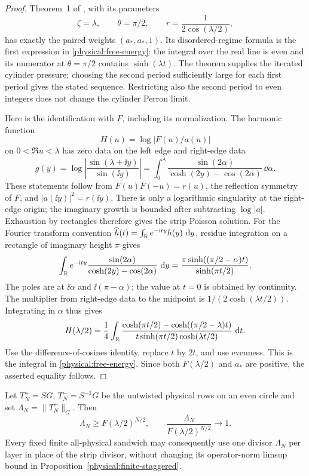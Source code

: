 \begin{proof}
Theorem~1 of \cite{SixVertex2022}, with its parameters
\[
 \zeta=\lambda,\qquad \theta=\pi/2,\qquad
 r=\frac1{2\cos(\lambda/2)},
\]
has exactly the paired weights \((a_*,a_*,1)\). Its disordered-regime
formula is the first expression in \eqref{physical:free-energy}:
the integral over the real line is even and its numerator at
\(\theta=\pi/2\) contains \(\sinh(\lambda t)\).
The theorem supplies the iterated cylinder pressure; choosing the
second period sufficiently large for each first period gives the
stated sequence. Restricting also the second period to even integers
does not change the cylinder Perron limit.

Here is the identification with \(F\), including its normalization.
The harmonic function
\[
 H(u)=\log|F(u)/a(u)|
\]
on \(0<\Re u<\lambda\) has zero data on the left edge and right-edge
data
\[
 g(y)=\log\left|\frac{\sin(\lambda+\ii y)}{\sin(\ii y)}\right|
 =\int_0^\lambda
 \frac{\sin(2\alpha)}{\cosh(2y)-\cos(2\alpha)}\,\dd\alpha.
\]
These statements follow from \(F(u)F(-u)=r(u)\), the reflection
symmetry of \(F\), and \(|a(\ii y)|^2=r(\ii y)\).
There is only a logarithmic singularity at the right-edge origin;
the imaginary growth is bounded after subtracting \(\log|a|\).
Exhaustion by rectangles therefore gives the strip Poisson solution.
For the Fourier transform convention
\(\widehat h(t)=\int_{\mathbb R}e^{-\mathrm i ty}h(y)\,\,\mathrm d y\), residue
integration on a rectangle of imaginary height \(\pi\) gives
\[
 \int_{\mathbb R}e^{-\mathrm i ty}
 \frac{\sin(2\alpha)}{\cosh(2y)-\cos(2\alpha)}\,\,\mathrm d y
 =\frac{\pi\sinh((\pi/2-\alpha)t)}{\sinh(\pi t/2)}.
\]
The poles are at \(\ii\alpha\) and \(\ii(\pi-\alpha)\);
the value at \(t=0\) is obtained by continuity. The multiplier from
right-edge data to the midpoint is \(1/(2\cosh(\lambda t/2))\).
Integrating in \(\alpha\) thus gives
\[
 H(\lambda/2)=\frac14\int_{\mathbb R}
 \frac{\cosh(\pi t/2)-\cosh((\pi/2-\lambda)t)}
 {t\sinh(\pi t/2)\cosh(\lambda t/2)}\,\,\mathrm d t.
\]
Use the difference-of-cosines identity, replace \(t\) by \(2t\),
and use evenness. This is the integral in
\eqref{physical:free-energy}. Since both \(F(\lambda/2)\) and
\(a_*\) are positive, the asserted equality follows.
\end{proof}

\begin{proposition}
\label{physical:vacuum-divisor}
Let \(T_N^+=SG\), \(T_N^-=S^{-1}G\) be the untwisted physical
rows on an even circle and set \(\Lambda_N=\|T_N^+\|_G\).
Then
\begin{equation}\label{physical:divisor-comparison}
 \Lambda_N\ge F(\lambda/2)^{N/2},\qquad
 \frac{\Lambda_N}{F(\lambda/2)^{N/2}}\longrightarrow1.
\end{equation}
Every fixed finite all-physical sandwich may consequently use one
divisor \(\Lambda_N\) per layer in place of the strip divisor,
without changing its operator-norm limsup bound in
Proposition~\ref{physical:finite-staggered}.
\end{proposition}

